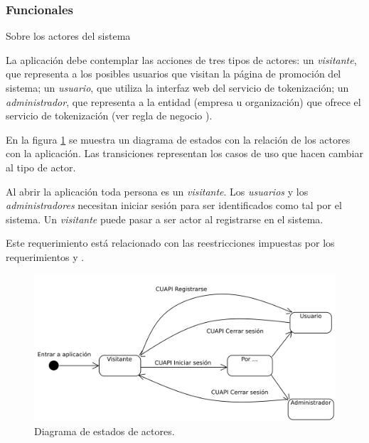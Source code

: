 %
%

\subsubsection{Funcionales}


{Sobre los actores del sistema}
{
  La aplicación debe contemplar las acciones de tres tipos de actores: un
  \textit{visitante}, que representa a los posibles usuarios que visitan la
  página de promoción del sistema; un \textit{usuario}, que utiliza la interfaz
  web del servicio de tokenización; un \textit{administrador}, que representa a
  la entidad (empresa u organización) que ofrece el servicio de tokenización
  (ver regla de negocio ).

  {
    En la figura \ref{estados_actores} se muestra un diagrama de estados con
    la relación de los actores con la aplicación. Las transiciones representan
    los casos de uso que hacen cambiar al tipo de actor.

    Al abrir la aplicación toda persona es un \textit{visitante}. Los
    \textit{usuarios} y los \textit{administradores} necesitan iniciar sesión
    para ser identificados como tal por el sistema. Un \textit{visitante} puede
    pasar a ser actor al registrarse en el sistema.

    Este requerimiento está relacionado con las reestricciones impuestas por los
    requerimientos  y
    .
  }
}


\begin{figure}
  \begin{center}
    \includegraphics[width=0.8\linewidth]{diagramas/flujo_de_actores.png}
    \caption{Diagrama de estados de actores.}
    \label{estados_actores}
  \end{center}
\end{figure}

